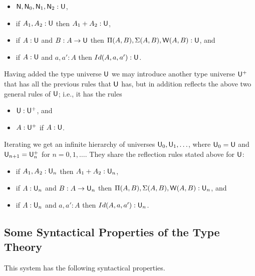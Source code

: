 {\begin{itemize}
\item ${\sf N},{\sf N}_0,{\sf N}_1,{\sf N}_2:{\sf U}$,
\item if $A_1,A_2:{\sf U}$ then $A_1+A_2:{\sf U}$,
\item if $A:{\sf U}$ and $B:A\rightarrow{\sf U}$ then     $\Pi(A,B),\Sigma(A,B),{\sf W}(A,B):{\sf U}$, and 
\item if $A:{\sf U}$ and $a,a':A$ then $Id(A,a,a'):{\sf U}$.
\end{itemize}

Having added the type universe ${\sf U}$ we may introduce another type universe
${\sf U}^+$ that has all the previous rules that ${\sf U}$ has, but in addition reflects the above two general rules of ${\sf U}$; i.e., it has the rules

\medskip

\begin{itemize}
\item ${\sf U}:{\sf U}^+$, and
\item $A:{\sf U}^+$ if $A:{\sf U}$.
\end{itemize}

\medskip

Iterating we get an infinite hierarchy of universes ${\sf U}_0,{\sf U}_1,\ldots$, where
${\sf U}_0={\sf U}$ and ${\sf U}_{n+1}={\sf U}_n^+$ for $n=0,1,\ldots$.  They share the reflection rules
stated above for ${\sf U}$:

\begin{itemize}
\item if $A_1,A_2:{\sf U}_n$ then $A_1+A_2:{\sf U}_n$,
\item if $A:{\sf U}_n$ and $B:A\rightarrow{\sf U}_n$ then     $\Pi(A,B),\Sigma(A,B),{\sf W}(A,B):{\sf U}_n$, and 
\item if $A:{\sf U}_n$ and $a,a':A$ then $Id(A,a,a'):{\sf U}_n$.
\end{itemize}


\medskip
\subsection*{Some Syntactical Properties of the Type Theory}
 This system has the following syntactical properties.

}
